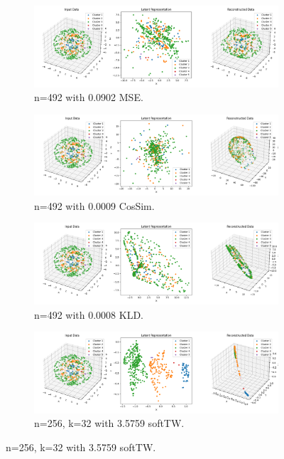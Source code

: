 \begin{figure}[htbp]
  \centering
  \begin{subfigure}[b]{1.0\textwidth}
    \centering
    \includegraphics[width=\linewidth]{images/RQ2/mse/3DSphere_-1_0.0902.png}
    \caption{n=492 with 0.0902 MSE.}
    \label{fig:RQ2/mse/3DSphere}
  \end{subfigure}
  \hfill
  \begin{subfigure}[b]{1.0\textwidth}
    \centering
    \includegraphics[width=\linewidth]{images/RQ2/csi/3DSphere_2_0.0009.png}
    \caption{n=492 with 0.0009 CosSim.}
    \label{fig:RQ2/csi/3DSphere}
  \end{subfigure}
  \hfill
  \begin{subfigure}[b]{1.0\textwidth}
    \centering
    \includegraphics[width=\linewidth]{images/RQ2/kld/3DSphere_-1_0.0008.png}
    \caption{n=492 with 0.0008 KLD.}
    \label{fig:RQ2/kld/3DSphere}
  \end{subfigure}
  \hfill
  \begin{subfigure}[b]{1.0\textwidth}
    \centering
    \includegraphics[width=\linewidth]{images/RQ2/tru/3DSphere_256n_32k_3.5759.png}
    \caption{n=256, k=32 with 3.5759 softTW.}
    \label{fig:RQ2/tru/3DSphere}
  \end{subfigure}


\end{figure}
